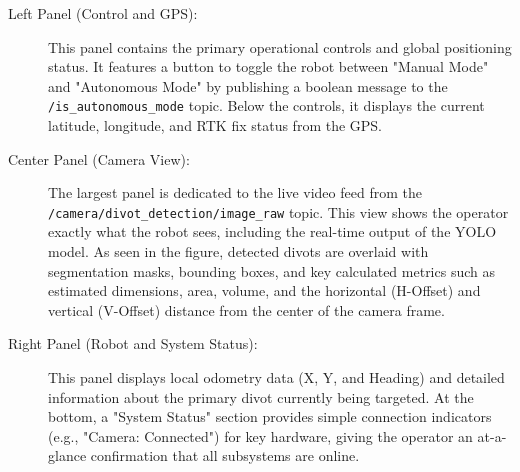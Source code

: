 \begin{description}
    \item[Left Panel (Control and GPS):] This panel contains the primary operational controls and global positioning status. It features a button to toggle the robot between "Manual Mode" and "Autonomous Mode" by publishing a boolean message to the \texttt{/is\_autonomous\_mode} topic. Below the controls, it displays the current latitude, longitude, and RTK fix status from the GPS.

    \item[Center Panel (Camera View):] The largest panel is dedicated to the live video feed from the \texttt{/camera/divot\_detection/image\_raw} topic. This view shows the operator exactly what the robot sees, including the real-time output of the YOLO model. As seen in the figure, detected divots are overlaid with segmentation masks, bounding boxes, and key calculated metrics such as estimated dimensions, area, volume, and the horizontal (H-Offset) and vertical (V-Offset) distance from the center of the camera frame.

    \item[Right Panel (Robot and System Status):] This panel displays local odometry data (X, Y, and Heading) and detailed information about the primary divot currently being targeted. At the bottom, a "System Status" section provides simple connection indicators (e.g., "Camera: Connected") for key hardware, giving the operator an at-a-glance confirmation that all subsystems are online.
\end{description}

